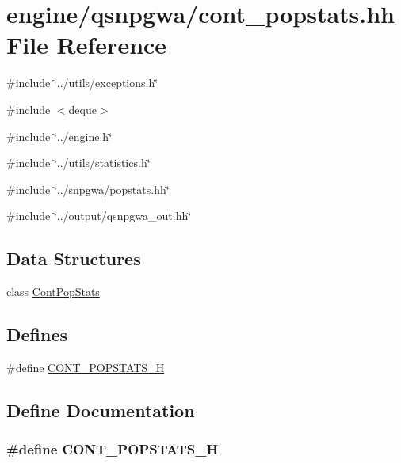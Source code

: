 \hypertarget{cont__popstats_8hh}{
\section{engine/qsnpgwa/cont\_\-popstats.hh File Reference}
\label{cont__popstats_8hh}
}
{\ttfamily \#include \char`\"{}../utils/exceptions.h\char`\"{}}\par
{\ttfamily \#include $<$deque$>$}\par
{\ttfamily \#include \char`\"{}../engine.h\char`\"{}}\par
{\ttfamily \#include \char`\"{}../utils/statistics.h\char`\"{}}\par
{\ttfamily \#include \char`\"{}../snpgwa/popstats.hh\char`\"{}}\par
{\ttfamily \#include \char`\"{}../output/qsnpgwa\_\-out.hh\char`\"{}}\par
\subsection*{Data Structures}
\begin{DoxyCompactItemize}
\item 
class \hyperlink{classContPopStats}{ContPopStats}
\end{DoxyCompactItemize}
\subsection*{Defines}
\begin{DoxyCompactItemize}
\item 
\#define \hyperlink{cont__popstats_8hh_a4125f6093c3e688a9d81f49afd282d45}{CONT\_\-POPSTATS\_\-H}
\end{DoxyCompactItemize}


\subsection{Define Documentation}
\hypertarget{cont__popstats_8hh_a4125f6093c3e688a9d81f49afd282d45}{
\subsubsection[{CONT\_\-POPSTATS\_\-H}]{\setlength{\rightskip}{0pt plus 5cm}\#define CONT\_\-POPSTATS\_\-H}}
\label{cont__popstats_8hh_a4125f6093c3e688a9d81f49afd282d45}
